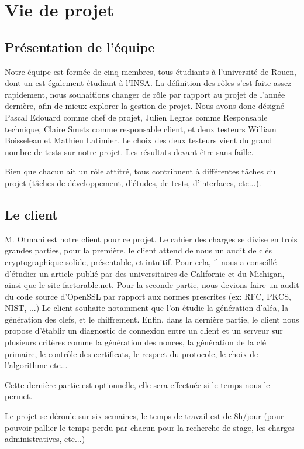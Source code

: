 \chapter{Vie de projet}
\section{Présentation de l'équipe}

Notre équipe est formée de cinq membres, tous étudiants à l'université de Rouen, dont un est également étudiant à l'INSA.
La définition des rôles s'est faite assez rapidement, nous souhaitions changer de rôle par rapport au projet de l'année dernière, afin de mieux explorer la gestion de projet.
Nous avons donc désigné Pascal Edouard comme chef de projet, Julien Legras comme Responsable technique, Claire Smets comme responsable client, et deux testeurs William Boisseleau et Mathieu Latimier.
Le choix des deux testeurs vient  du grand nombre de tests sur notre projet. Les résultats devant être sans faille.

Bien que chacun ait un rôle attitré, tous contribuent à différentes tâches du projet (tâches de développement, d'études, de tests, d'interfaces, etc...).

\section{Le client}

M. Otmani est notre client pour ce projet. Le cahier des charges se divise en trois grandes parties, pour la première, le client attend de nous un audit de clés cryptographique solide, présentable, et intuitif. Pour cela, il nous a conseillé d'étudier un article publié par des universitaires de Californie et du Michigan, ainsi que le site factorable.net.
Pour la seconde partie, nous devions faire un audit du code source d'OpenSSL par rapport aux normes prescrites (ex: RFC, PKCS, NIST, ...)
Le client souhaite notamment que l'on étudie la génération d'aléa, la génération des clefs, et le chiffrement.
Enfin, dans la dernière partie, le client nous propose d'établir un diagnostic de connexion entre un client et un serveur sur plusieurs critères comme la génération des nonces, la génération de la clé primaire, le contrôle des certificats, le respect du protocole, le choix de l'algorithme etc...

Cette dernière partie est optionnelle, elle sera effectuée si le temps 
nous le permet.

Le projet se déroule sur six semaines, le temps de travail est de 8h/jour (pour pouvoir pallier le temps perdu par chacun pour la recherche de stage, les charges administratives, etc...)

